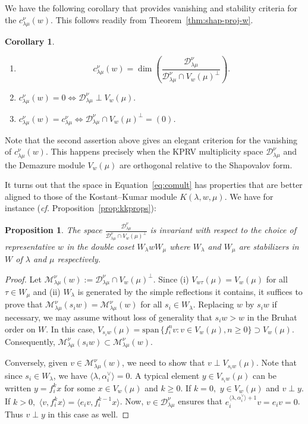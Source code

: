 \documentclass[12pt,reqno]{amsart}
\theoremstyle{plain}
\newtheorem{corollary}[theorem]{Corollary}
\newtheorem{proposition}[theorem]{Proposition}
\theoremstyle{definition}
\theoremstyle{remark}
\theoremstyle{plain}
\newcommand{\mcd}{\mathcal{D}_{\!\lambda\mu}^{\nu}}
\newcommand{\mcmw}[1][w]{\mathcal{M}_{\!\lambda\mu}^{\nu}(#1)}
\newcommand{\lrw}{c_{\lambda\mu}^\nu(w)}
\newcommand{\lr}{c_{\lambda\mu}^\nu}
\begin{document}
\subsection{}
We have the following corollary that provides vanishing and stability criteria for the $\lrw$. This follows readily from Theorem~\ref{thm:shap-proj-w}.
\begin{corollary}
\begin{enumerate}
    \item 
\begin{equation}\label{eq:comult}
    c_{\lambda\mu}^\nu(w)= \dim \left(\frac{\mcd}{\mcd \cap V_w(\mu)^\perp}\right).
    \end{equation}
\item $\lrw =0 \iff \mcd \perp V_w(\mu).$
\item $\lrw = \lr \iff \mcd \cap V_w(\mu)^\perp = (0)$. 
\end{enumerate}
\end{corollary}
Note that the second assertion above gives an elegant criterion for the vanishing of $\lrw$. This happens precisely when the KPRV multiplicity space $\mcd$ and the Demazure module $V_w(\mu)$ are orthogonal relative to the Shapovalov form.

It turns out that the space in Equation~\eqref{eq:comult} has properties that are better aligned to those of the Kostant--Kumar module $K(\lambda,w,\mu)$.  We have for instance ({\em cf.} Proposition~\ref{prop:kkprops}):
\begin{proposition}
    The space $\frac{\mcd}{\mcd \cap V_w(\mu)^\perp}$ is invariant with respect to the choice of representative $w$ in the double coset $W_\lambda wW_\mu$ where $W_\lambda$ and $W_\mu$ are stabilizers  in $W$ of $\lambda$ and $\mu$ respectively. 
\end{proposition}
\begin{proof}
Let $\mcmw := \mcd \cap V_w(\mu)^\perp$. Since (i) $V_{w\tau}(\mu) = V_w(\mu)$ for all $\tau \in W_\mu$ and (ii) $W_\lambda$ is generated by the simple reflections it contains, it suffices to prove that $\mcmw[s_iw] = \mcmw$ for all $s_i \in W_\lambda$. Replacing $w$ by $s_i w$ if necessary, we may assume without loss of generality that $s_iw>w$ in the Bruhat order on $W$. In this case, 
$V_{s_iw}(\mu)=\mathrm{span} \, \{f_i^n v: v \in V_w(\mu), n \geq 0\} \supset V_w(\mu)$. Consequently, $\mcmw[s_iw] \subset \mcmw$.

 Conversely, given $v\in \mcmw$, we need to show that $v \perp V_{s_iw}(\mu)$. Note that since $s_i \in W_\lambda$, we have $\langle \lambda, \alpha_i^\vee \rangle =0$. A typical element $y \in V_{s_iw}(\mu)$ can be written $y = f_i^kx$ for some $x \in V_w(\mu)$ and $k\geq 0$. If $k=0,$ $y \in V_w(\mu)$ and $v \perp y$.  If $k>0,$ $\langle v,f_i^kx \rangle= \langle e_iv,f_i^{k-1}x\rangle$. Now, $v\in \mcd$ ensures that $e_i^{\langle\lambda,\alpha_i^\vee\rangle+1}v= e_i v = 0$. Thus $v \perp y$ in this case as well. 
 \end{proof}
\end{document}
